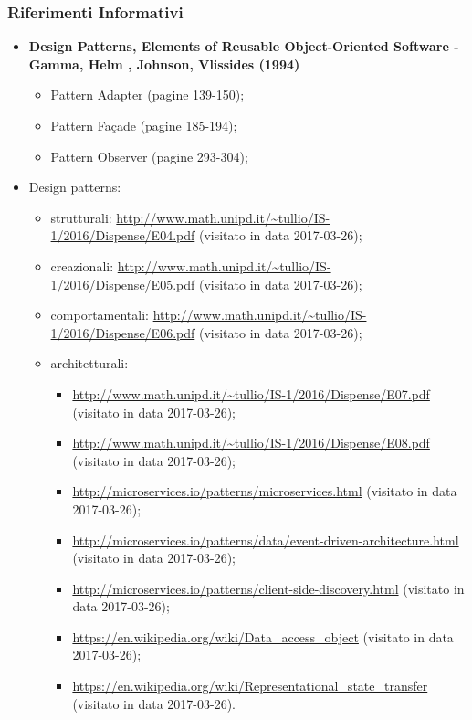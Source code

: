 	 \subsubsection{Riferimenti Informativi}
	  \begin{itemize}
		\item \textbf{Design Patterns, Elements of Reusable Object-Oriented Software - Gamma, Helm , Johnson, Vlissides (1994)}
		 \begin{itemize}
		  \item Pattern Adapter (pagine 139-150);
			\item Pattern Façade (pagine 185-194);
			\item Pattern Observer (pagine 293-304);
  	 \end{itemize}
	    \item Design patterns:
	      \begin{itemize}
	       \item strutturali:
	       \url{http://www.math.unipd.it/~tullio/IS-1/2016/Dispense/E04.pdf} (visitato in data 2017-03-26);
	       \item creazionali:
	       \url{http://www.math.unipd.it/~tullio/IS-1/2016/Dispense/E05.pdf} (visitato in data 2017-03-26);
	       \item comportamentali:
	       \url{http://www.math.unipd.it/~tullio/IS-1/2016/Dispense/E06.pdf} (visitato in data 2017-03-26);
	       \item architetturali:
	       \begin{itemize}
				 \item \url{http://www.math.unipd.it/~tullio/IS-1/2016/Dispense/E07.pdf} (visitato in data 2017-03-26);
	       \item \url{http://www.math.unipd.it/~tullio/IS-1/2016/Dispense/E08.pdf} (visitato in data 2017-03-26);
	       \item \url{http://microservices.io/patterns/microservices.html} (visitato in data 2017-03-26);
	       \item \url{http://microservices.io/patterns/data/event-driven-architecture.html} (visitato in data 2017-03-26);
	       \item \url{http://microservices.io/patterns/client-side-discovery.html} (visitato in data 2017-03-26);
	       \item \url{https://en.wikipedia.org/wiki/Data_access_object} (visitato in data 2017-03-26);
	       \item \url{https://en.wikipedia.org/wiki/Representational_state_transfer} (visitato in data 2017-03-26).

\end{itemize}
\end{itemize}
\end{itemize}
